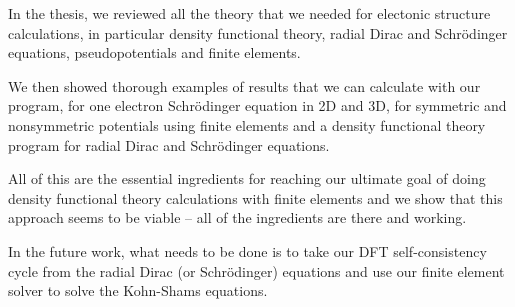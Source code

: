 In the thesis, we reviewed all the theory that we needed for electonic structure
calculations, in particular density functional theory, radial Dirac and
Schr\"odinger equations, pseudopotentials and finite elements.

We then showed thorough examples of results that we can calculate with our
program, for one electron Schr\"odinger equation in 2D and 3D, for symmetric
and nonsymmetric potentials using finite elements and a density functional
theory program for radial Dirac and Schr\"odinger equations.

All of this are the essential ingredients for reaching our ultimate goal of
doing density functional theory calculations with finite elements and we show
that this approach seems to be viable -- all of the ingredients are there and
working.

In the future work, what needs to be done is to take our DFT self-consistency
cycle from the radial Dirac (or Schr\"odinger) equations and use our finite
element solver to solve the Kohn-Shams equations.
